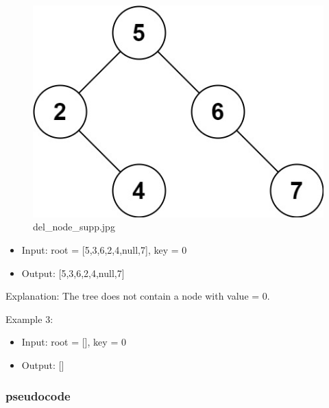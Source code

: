\documentclass[11pt]{article}
\providecommand{\tightlist}{%
      \setlength{\itemsep}{0pt}\setlength{\parskip}{0pt}}
\begin{document}
\begin{figure}
\centering
\includegraphics{7813d691-3f62-4e33-bee7-bb2a52c32015.jpg}
\caption{del\_node\_supp.jpg}
\end{figure}

\begin{itemize}
\tightlist
\item
  Input: root = {[}5,3,6,2,4,null,7{]}, key = 0
\item
  Output: {[}5,3,6,2,4,null,7{]}
\end{itemize}

Explanation: The tree does not contain a node with value = 0.

Example 3:

\begin{itemize}
\tightlist
\item
  Input: root = {[}{]}, key = 0
\item
  Output: {[}{]}
\end{itemize}

    \subsubsection{pseudocode}\label{pseudocode}
\end{document}
